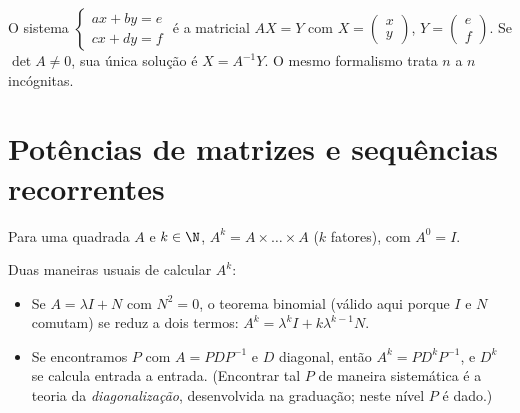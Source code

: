 \begin{method}\label{met:g12:matrix:systems}
O sistema
$\begin{cases} ax + by = e\\ cx + dy = f \end{cases}$
é a  matricial $AX = Y$ com
$X = \begin{pmatrix} x \\ y\end{pmatrix}$,
$Y = \begin{pmatrix} e \\ f\end{pmatrix}$. Se $\det A \neq 0$, sua única
solução é $X = A^{-1}Y$. O mesmo formalismo trata $n$  a $n$
incógnitas.
\end{method}

\section{Potências de matrizes e sequências recorrentes}

\begin{definition}\label{def:g12:matrix:power}
Para uma  quadrada $A$ e $k \in \N$, $A^k = A \times \dots \times A$
($k$ fatores), com $A^0 = I$.
\end{definition}

\begin{method}\label{met:g12:matrix:powers}
Duas maneiras usuais de calcular $A^k$:
\begin{itemize}
  \item Se $A = \lambda I + N$ com $N^2 = 0$, o teorema binomial
        (válido aqui porque $I$ e $N$ comutam) se reduz a dois termos:
        $A^k = \lambda^k I + k \lambda^{k-1} N$.
  \item Se encontramos $P$  com $A = PDP^{-1}$ e $D$ diagonal,
        então $A^k = P D^k P^{-1}$, e $D^k$ se calcula entrada a entrada.
        (Encontrar tal $P$ de maneira sistemática é a teoria da
        \emph{diagonalização}, desenvolvida na graduação; neste nível $P$ é
        dado.)
\end{itemize}
\end{method}

